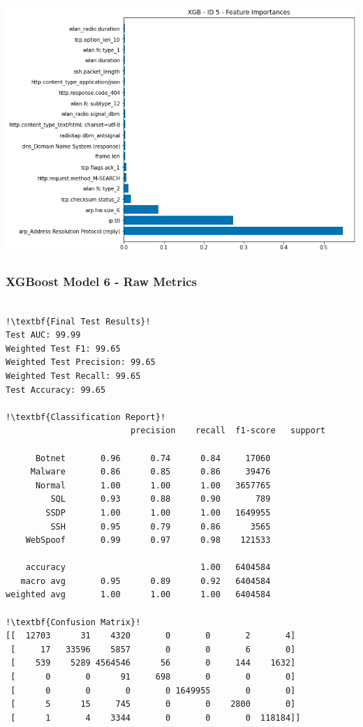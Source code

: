 \begin{appendices}
\begin{center}
	\centering
	\includegraphics[width=\textwidth]{Appendices/Images/XGB/Model5/XGB_Model5_FI.png}
\end{center}

\subsubsection{XGBoost Model 6 - Raw Metrics}
\begin{lstlisting}[escapechar=!]

!\textbf{Final Test Results}!
Test AUC: 99.99
Weighted Test F1: 99.65
Weighted Test Precision: 99.65
Weighted Test Recall: 99.65
Test Accuracy: 99.65

!\textbf{Classification Report}!
			             precision    recall  f1-score   support

      Botnet       0.96      0.74      0.84     17060
     Malware       0.86      0.85      0.86     39476
      Normal       1.00      1.00      1.00   3657765
         SQL       0.93      0.88      0.90       789
        SSDP       1.00      1.00      1.00   1649955
         SSH       0.95      0.79      0.86      3565
    WebSpoof       0.99      0.97      0.98    121533

    accuracy                           1.00   6404584
   macro avg       0.95      0.89      0.92   6404584
weighted avg       1.00      1.00      1.00   6404584
    
!\textbf{Confusion Matrix}!    
[[  12703      31    4320       0       0       2       4]
 [     17   33596    5857       0       0       6       0]
 [    539    5289 4564546      56       0     144    1632]
 [      0       0      91     698       0       0       0]
 [      0       0       0       0 1649955       0       0]
 [      5      15     745       0       0    2800       0]
 [      1       4    3344       0       0       0  118184]]


\end{lstlisting}
\end{appendices}
